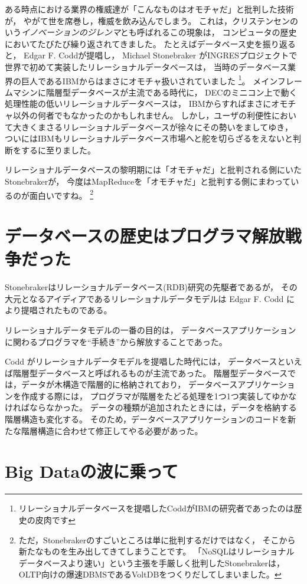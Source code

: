 ある時点における業界の権威達が「こんなものはオモチャだ」と批判した技術が，
やがて世を席巻し，権威を飲み込んでしまう。
これは，クリステンセンのいう{\em イノベーションのジレンマ}とも呼ばれるこの現象は，
コンピュータの歴史においてたびたび繰り返されてきました。
たとえばデータベース史を振り返ると，
Edgar F. Coddが提唱し，
Michael Stonebraker がINGRESプロジェクトで世界で初めて実装したリレーショナルデータベースは，
当時のデータベース業界の巨人であるIBMからはまさにオモチャ扱いされていました
\footnote{リレーショナルデータベースを提唱したCoddがIBMの研究者であったのは歴史の皮肉です}。
メインフレームマシンに階層型データベースが主流である時代に，
DECのミニコン上で動く処理性能の低いリレーショナルデータベースは，
IBMからすればまさにオモチャ以外の何者でもなかったのかもしれません。
しかし，ユーザの利便性において大きくまさるリレーショナルデータベースが徐々にその勢いをましてゆき，
ついにはIBMもリレーショナルデータベース市場へと舵を切らざるをえないと判断をするに至りました。

リレーショナルデータベースの黎明期には「オモチャだ」と批判される側にいたStonebrakerが，
今度はMapReduceを「オモチャだ」と批判する側にまわっているのが面白いですね。
\footnote{ただ，Stonebrakerのすごいところは単に批判するだけではなく，
そこから新たなものを生み出してきてしまうことです。
「NoSQLはリレーショナルデータベースより速い」という主張を手厳しく批判したStonebrakerは，
OLTP向けの爆速DBMSであるVoltDBをつくりだしてしまいました。}

\section{データベースの歴史はプログラマ解放戦争だった}

Stonebrakerはリレーショナルデータベース(RDB)研究の先駆者であるが，
その大元となるアイディアであるリレーショナルデータモデルは Edgar F. Codd により提唱されたものである。

リレーショナルデータモデルの一番の目的は，
データベースアプリケーションに関わるプログラマを``手続き''から解放することであった。

Codd がリレーショナルデータモデルを提唱した時代には，
データベースといえば階層型データベースと呼ばれるものが主流であった。
階層型データベースでは，データが木構造で階層的に格納されており，
データベースアプリケーションを作成する際には，
プログラマが階層をたどる処理を1つ1つ実装してゆかなければならなかった。
データの種類が追加されたときには，データを格納する階層構造も変化する。
そのため，データベースアプリケーションのコードを新たな階層構造に合わせて修正してやる必要があった。


\section{Big Dataの波に乗って}

